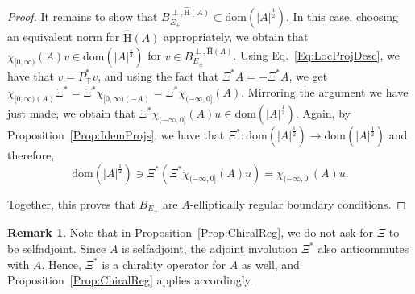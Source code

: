 \documentclass[a4paper,10pt,reqno]{amsart}
\newcommand{\modulus}[1]{|#1|}
\newcommand{\hatH}{\hat{\mathrm{H}}}
\newcommand{\dom}{\mathrm{dom}}
\theoremstyle{definition}
\newtheorem{remark}[theorem]{Remark}
\begin{document}
\begin{proof}
It remains to show that $B_{E_{\pm}}^{\perp, \hatH(A)} \subset \dom(\modulus{A}^{\frac12})$.
In this case, choosing an equivalent norm for $\hatH(A)$ appropriately, we obtain that $\chi_{[0,\infty)}(A)v \in \dom(\modulus{A}^{\frac12})$
for $v \in B_{E_{\pm}}^{\perp,\hatH(A)}$.
Using Eq.~\eqref{Eq:LocProjDesc}, we have that $v = P_{\mp}^\ast v$, and using the fact that $\Xi^\ast A = - \Xi^\ast A$, we get
$\chi_{[0,\infty)(A)}\Xi^\ast = \Xi^\ast \chi_{[0,\infty)(-A)} = \Xi^\ast \chi_{(-\infty,0]}(A)$.
Mirroring the argument we have just made, we obtain that  $\Xi^\ast \chi_{(-\infty,0]}(A)u \in \dom(\modulus{A}^{\frac12})$.
Again, by Proposition~\ref{Prop:IdemProjs}, we have that $\Xi^\ast: \dom(\modulus{A}^{\frac12}) \to \dom(\modulus{A}^{\frac12})$ and therefore,
$$ \dom(\modulus{A}^{\frac12}) \ni \Xi^\ast (\Xi^\ast \chi_{(-\infty,0]}(A)u) = \chi_{(-\infty,0]}(A)u.$$

Together, this proves that $B_{E_{\pm}}$ are $A$-elliptically regular boundary conditions.
\end{proof}

\begin{remark}
Note that in Proposition~\ref{Prop:ChiralReg}, we do not ask for $\Xi$ to be selfadjoint.
Since $A$ is selfadjoint, the adjoint involution $\Xi^*$ also anticommutes with $A$.
Hence, $\Xi^*$ is a chirality operator for $A$ as well, and Proposition~\ref{Prop:ChiralReg} applies accordingly.
\end{remark}
\end{document}
